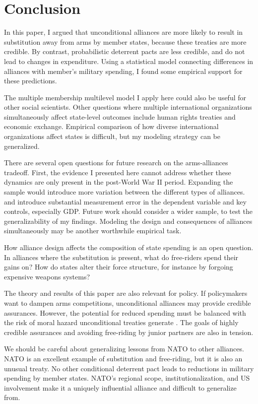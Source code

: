 \documentclass[12pt]{article}
\begin{document}
\section*{Conclusion}

In this paper, I argued that unconditional alliances are more likely to result in substitution away from arms by member states, because these treaties are more credible. By contrast, probabilistic deterrent pacts are less credible, and do not lead to changes in expenditure. Using a statistical model connecting differences in alliances with member's military spending, I found some empirical support for these predictions.

The multiple membership multilevel model I apply here could also be useful for other social scientists. Other questions where multiple international organizations simultaneously affect state-level outcomes include human rights treaties and economic exchange. Empirical comparison of how diverse international organizations affect states is difficult, but my modeling strategy can be generalized. 

There are several open questions for future research on the arms-alliances tradeoff. First, the evidence I presented here cannot address whether these dynamics are only present in the post-World War II period. Expanding the sample would introduce more variation between the different types of alliances. and introduce substantial measurement error in the dependent variable and key controls, especially GDP. Future work should consider a wider sample, to test the generalizability of my findings. Modeling the design and consequences of alliances simultaneously may be another worthwhile empirical task. 

How alliance design affects the composition of state spending is an open question. In alliances where the substitution is present, what do free-riders spend their gains on? How do states alter their force structure, for instance by forgoing expensive weapons systems? 

The theory and results of this paper are also relevant for policy. If policymakers want to dampen arms competitions, unconditional alliances may provide credible assurances. However, the potential for reduced spending must be balanced with the risk of moral hazard unconditional treaties generate \citep{Benson2012}. The goals of highly credible assurances and avoiding free-riding by junior partners are also in tension. 

We should be careful about generalizing lessons from NATO to other alliances. NATO is an excellent example of substitution and free-riding, but it is also an unusual treaty. No other conditional deterrent pact leads to reductions in military spending by member states. NATO's regional scope, institutionalization, and US involvement make it a uniquely influential alliance and difficult to generalize from. 
\end{document}
